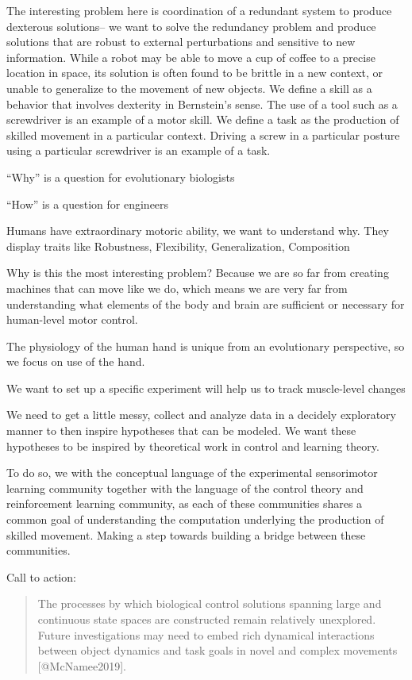 \documentclass[../main.tex]{subfiles}
\begin{document}
The interesting problem here is coordination of a redundant system to produce dexterous solutions-- we want to solve the redundancy problem and produce solutions that are robust to external perturbations and sensitive to new information. While a robot may be able to move a cup of coffee to a precise location in space, its solution is often found to be brittle in a new context, or unable to generalize to the movement of new objects. We define a skill as a behavior that involves dexterity in Bernstein's sense. The use of a tool such as a screwdriver is an example of a motor skill. We define a task as the production of skilled movement in a particular context. Driving a screw in a particular posture using a particular screwdriver is an example of a task.

``Why'' is a question for evolutionary biologists

``How'' is a question for engineers

Humans have extraordinary motoric ability, we want to understand why. They display traits like Robustness, Flexibility, Generalization, Composition

Why is this the most interesting problem? Because we are so far from creating machines that can move like we do, which means we are very far from understanding what elements of the body and brain are sufficient or necessary for human-level motor control.

The physiology of the human hand is unique from an evolutionary perspective, so we focus on use of the hand.

We want to set up a specific experiment will help us to track muscle-level changes

We need to get a little messy, collect and analyze data in a decidely exploratory manner to then inspire hypotheses that can be modeled. We want these hypotheses to be inspired by theoretical work in control and learning theory.

To do so, we with the conceptual language of the experimental sensorimotor learning community together with the language of the control theory and reinforcement learning community, as each of these communities shares a common goal of understanding the computation underlying the production of skilled movement. Making a step towards building a bridge between these communities.

Call to action:

\begin{quote}
  The processes by which biological control solutions spanning large and continuous state spaces are constructed remain relatively unexplored. Future investigations may need to embed rich dynamical interactions between object dynamics and task goals in novel and complex movements [@McNamee2019].
\end{quote}
\end{document}
